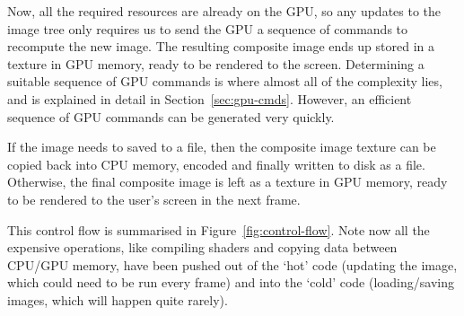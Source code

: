 \documentclass[12pt]{article}
\begin{document}
Now, all the required resources are already on the GPU, so any updates to the image tree only
requires us to send the GPU a sequence of commands to recompute the new image.  The resulting
composite image ends up stored in a texture in GPU memory, ready to be rendered to the screen.
Determining a suitable sequence of GPU commands is where almost all of the complexity lies, and is
explained in detail in Section~\ref{sec:gpu-cmds}.  However, an efficient sequence of GPU commands
can be generated very quickly.

If the image needs to saved to a file, then the composite image texture can be copied back into CPU
memory, encoded and finally written to disk as a file.  Otherwise, the final composite image is left
as a texture in GPU memory, ready to be rendered to the user's screen in the next frame.

This control flow is summarised in Figure~\ref{fig:control-flow}.  Note now all the expensive
operations, like compiling shaders and copying data between CPU/GPU memory, have been pushed out of
the `hot' code (updating the image, which could need to be run every frame) and into the `cold' code
(loading/saving images, which will happen quite rarely).
\end{document}
